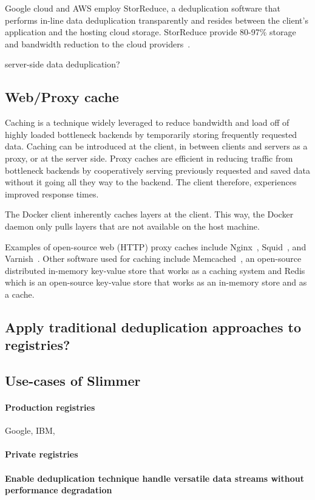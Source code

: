Google cloud and AWS employ StorReduce, a deduplication software that performs in-line data deduplication transparently and resides between the client's application and the hosting cloud storage. StorReduce provide 80-97\% storage and bandwidth reduction to the cloud providers~\cite{StorReduce_google}.


server-side data deduplication?

\subsection{Web/Proxy cache}
Caching is a technique widely leveraged to reduce bandwidth and load off of highly loaded bottleneck backends by temporarily storing frequently requested data. 
Caching can be introduced at the client, in between clients and servers as a proxy, or at the server side. 
Proxy caches are efficient in reducing traffic from bottleneck backends by cooperatively serving previously requested and saved data without it going all they way to the backend. 
The client therefore, experiences improved response times.

The Docker client inherently caches layers at the client. This way, the Docker daemon only pulls layers that are not available on the host machine. 

Examples of open-source web (HTTP) proxy caches include Nginx~\cite{?}, Squid~\cite{?}, and Varnish~\cite{?}. Other software used for caching include Memcached~\cite{?}, an open-source distributed in-memory key-value store that works as a caching system and Redis~\cite{?} which is an open-source key-value store that works as an in-memory store and as a cache.



\subsection{Apply traditional deduplication approaches to registries?}



\subsection{Use-cases of Slimmer}

\paragraph{Production registries} Google, IBM,

\paragraph{Private registries}

\paragraph{Enable deduplication technique handle versatile data streams without performance degradation}

